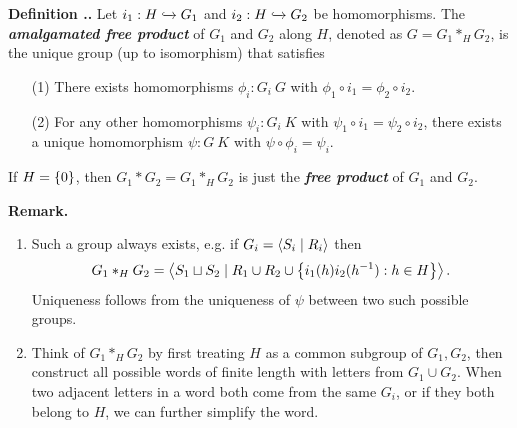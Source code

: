 \documentclass{natsirt}
\renewcommand{\emph}[1]{\textbf{\textit{#1}}}
\newcounter{def}[section]
\newenvironment{defbox}[1][]{
\begin{bluebox}[#1]\refstepcounter{def}\textbf{Definition \thesection.\thedef. }}{\end{bluebox}}
\begin{document}
\begin{defbox}
    Let $i_1: H \xhookrightarrow{} G_1$ and $i_2: H\xhookrightarrow{} G_2$ be homomorphisms. The \emph{amalgamated free product} of $G_1$ and $G_2$ along $H$, denoted as $G=G_1 *_H G_2$, is the unique group (up to isomorphism) that satisfies
    \begin{enumerate}
        \item[(1)] There exists homomorphisms $\phi_i: G_i\> G$ with $\phi_1 \circ i_1 = \phi_2 \circ i_2$.
        \item[(2)] For any other homomorphisms $\psi_i: G_i\> K$ with $\psi_1 \circ i_1 = \psi_2 \circ i_2$, there exists a unique homomorphism $\psi:G\> K$ with $\psi \circ \phi_i = \psi_i$.
    \end{enumerate}\vspace{-0.7cm}
    \begin{center}
    \end{center}\vspace{-0.5cm}
    If $H=\left\{ 0 \right\}$, then $G_1 * G_2 = G_1 *_H G_2$ is just the \emph{free product} of $G_1$ and $G_2$.
\end{defbox}

\begin{whitebox}
    \textbf{Remark.} \begin{enumerate}
        \item Such a group always exists, e.g. if $G_i=\left\langle S_i \mid R_i \right\rangle$ then
    \begin{align*}
        G_1 *_H G_2 = \left\langle S_1 \sqcup S_2 \mid R_1 \cup R_2 \cup \left\{ i_1(h)i_2(h^{-1}): h\in H \right\} \right\rangle.
    \end{align*}
    Uniqueness follows from the uniqueness of $\psi$ between two such possible groups.
        \item Think of $G_1 *_H G_2$ by first treating $H$ as a common subgroup of $G_1,G_2$, then construct all possible words of finite length with letters from $G_1\cup G_2$. When two adjacent letters in a word both come from the same $G_i$, or if they both belong to $H$, we can further simplify the word.
    \end{enumerate}
\end{whitebox}
\end{document}
